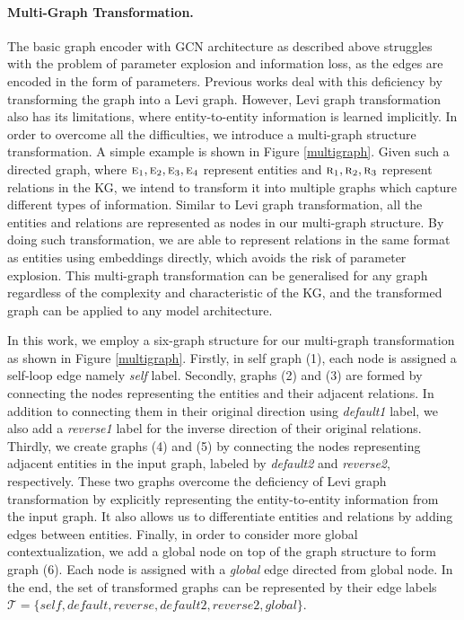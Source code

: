 \documentclass[11pt,a4paper]{article}
\begin{document}
\paragraph{Multi-Graph Transformation.}
\label{sec:mgt}
The basic graph encoder with GCN architecture as described above struggles with the problem of parameter explosion and information loss, as the edges are encoded in the form of parameters.
Previous works \cite{beck2018graph,guo2019densely,koncel2019text} deal with this deficiency by transforming the graph into a Levi graph.
However, Levi graph transformation also has its limitations, where entity-to-entity information is learned implicitly.
In order to overcome all the difficulties, we introduce a multi-graph structure transformation.
A simple example is shown in Figure \ref{multigraph}.
Given such a directed graph, where $\textsc{e}_{1}, \textsc{e}_{2}, \textsc{e}_{3}, \textsc{e}_{4}$ represent entities and $\textsc{r}_{1}, \textsc{r}_{2}, \textsc{r}_{3}$ represent relations in the KG, we intend to transform it into multiple graphs which capture different types of information. 
Similar to Levi graph transformation, all the entities and relations are represented as nodes in our multi-graph structure.
By doing such transformation, we are able to represent relations in the same format as entities using embeddings directly, which avoids the risk of parameter explosion.
This multi-graph transformation can be generalised for any graph regardless of the complexity and characteristic of the KG, and the transformed graph can be applied to any model architecture.

In this work, we employ a six-graph structure for our multi-graph transformation as shown in Figure \ref{multigraph}.
Firstly, in self graph (1), each node is assigned a self-loop edge namely \textit{self} label.
Secondly, graphs (2) and (3) are formed by connecting the nodes representing the entities and their adjacent relations.
In addition to connecting them in their original direction using \textit{default1} label, we also add a \textit{reverse1} label for the inverse direction of their original relations.
Thirdly, we create graphs (4) and (5) by connecting the nodes representing adjacent entities in the input graph, labeled by \textit{default2} and \textit{reverse2}, respectively.
These two graphs overcome the deficiency of Levi graph transformation by explicitly representing the entity-to-entity information from the input graph.
It also allows us to differentiate entities and relations by adding edges between entities.
Finally, in order to consider more global contextualization, we add a global node on top of the graph structure to form graph (6).
Each node is assigned with a \textit{global} edge directed from global node.
In the end, the set of transformed graphs can be represented by their edge labels $\mathcal{T} = \{ \textit{self}, \textit{default}, \textit{reverse}, \textit{default2}, \textit{reverse2}, \textit{global} \}$.
\end{document}
